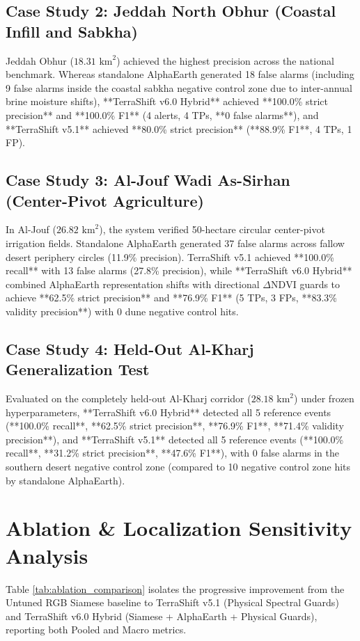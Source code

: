 \subsection{Case Study 2: Jeddah North Obhur (Coastal Infill and Sabkha)}
Jeddah Obhur ($18.31\text{ km}^2$) achieved the highest precision across the national benchmark. Whereas standalone AlphaEarth generated 18 false alarms (including 9 false alarms inside the coastal sabkha negative control zone due to inter-annual brine moisture shifts), **TerraShift v6.0 Hybrid** achieved **100.0\% strict precision** and **100.0\% F1** (4 alerts, 4 TPs, **0 false alarms**), and **TerraShift v5.1** achieved **80.0\% strict precision** (**88.9\% F1**, 4 TPs, 1 FP).

\subsection{Case Study 3: Al-Jouf Wadi As-Sirhan (Center-Pivot Agriculture)}
In Al-Jouf ($26.82\text{ km}^2$), the system verified 50-hectare circular center-pivot irrigation fields. Standalone AlphaEarth generated 37 false alarms across fallow desert periphery circles (11.9\% precision). TerraShift v5.1 achieved **100.0\% recall** with 13 false alarms (27.8\% precision), while **TerraShift v6.0 Hybrid** combined AlphaEarth representation shifts with directional $\Delta\text{NDVI}$ guards to achieve **62.5\% strict precision** and **76.9\% F1** (5 TPs, 3 FPs, **83.3\% validity precision**) with 0 dune negative control hits.

\subsection{Case Study 4: Held-Out Al-Kharj Generalization Test}
Evaluated on the completely held-out Al-Kharj corridor ($28.18\text{ km}^2$) under frozen hyperparameters, **TerraShift v6.0 Hybrid** detected all 5 reference events (**100.0\% recall**, **62.5\% strict precision**, **76.9\% F1**, **71.4\% validity precision**), and **TerraShift v5.1** detected all 5 reference events (**100.0\% recall**, **31.2\% strict precision**, **47.6\% F1**), with 0 false alarms in the southern desert negative control zone (compared to 10 negative control zone hits by standalone AlphaEarth).

\section{Ablation & Localization Sensitivity Analysis}
\label{sec:res_ablation}
Table \ref{tab:ablation_comparison} isolates the progressive improvement from the Untuned RGB Siamese baseline to TerraShift v5.1 (Physical Spectral Guards) and TerraShift v6.0 Hybrid (Siamese + AlphaEarth + Physical Guards), reporting both Pooled and Macro metrics.

